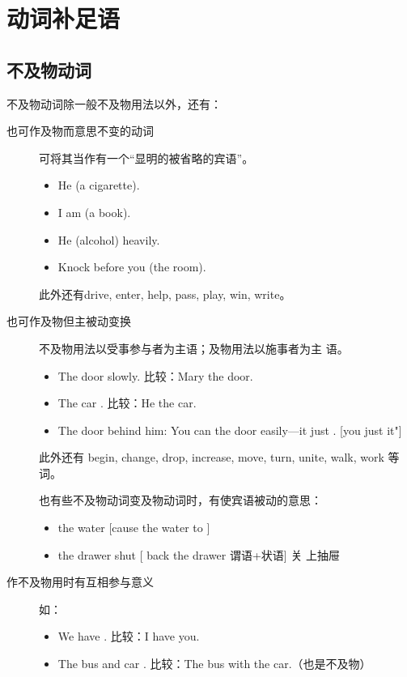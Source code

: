 \section{动词补足语}

\subsection{不及物动词}

不及物动词除一般不及物用法以外，还有：
\begin{description}
\item[也可作及物而意思不变的动词] 可将其当作有一个“显明的被省略的宾语”。
  \begin{itemize}
  \item He  (a cigarette).

  \item I am  (a book).

  \item He  (alcohol) heavily.

  \item Knock before you  (the room).
  \end{itemize}

  此外还有drive, enter, help, pass, play, win, write。

\item[也可作及物但主被动变换] 不及物用法以受事参与者为主语；及物用法以施事者为主
语。
  \begin{itemize}
  \item The door  slowly. 比较：Mary  the door.

  \item The car . 比较：He  the car.

  \item The door  behind him: You can  the door
easily---it just . [you just  it"]
\end{itemize}

此外还有 begin, change, drop, increase, move, turn, unite, walk, work 等词。

也有些不及物动词变及物动词时，有使宾语被动的意思：
\begin{itemize}
\item {} the water [cause the water to ]

\item {} the drawer shut [ back the drawer 谓语+状语] 关
  上抽屉
\end{itemize}

\item[作不及物用时有互相参与意义] 如：
  \begin{itemize}
  \item We have . 比较：I have  you.

  \item The bus and car . 比较：The bus  with the
    car.（也是不及物）
  \end{itemize}
\end{description}


